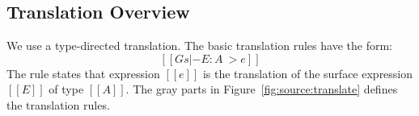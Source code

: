 
\subsection{Translation Overview}

We use a type-directed translation. The basic translation rules have the form:
\[
[[Gs  |- E : A ~> e]]
\]
The rule states that \name expression $[[e]]$ is the translation of the
surface expression $[[E]]$ of type $[[A]]$.  The gray parts in
Figure~\ref{fig:source:translate} defines the translation
rules. 

